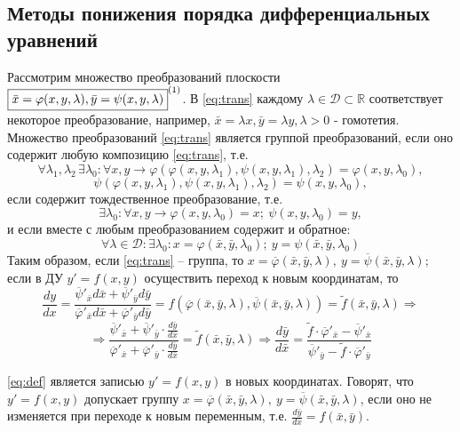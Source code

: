 \subsection{Методы понижения порядка дифференциальных уравнений}
\begin{proposition}

	Рассмотрим множество преобразований плоскости \\ $ \boxed{\bar{x} = \varphi(x, y, \lambda), \bar{y} = \psi (x, y, \lambda)}^{\eqnum\label{eq:trans}} $. В \eqref{eq:trans} каждому $ \lambda \in \mathcal{ D }  \subset \mathbb{ R } $ соответствует некоторое преобразование, например, $ \bar{x} = \lambda x, \bar{y} = \lambda y, \lambda > 0 $ - гомотетия. Множество преобразований \eqref{eq:trans}  является группой преобразований, если оно содержит любую композицию \eqref{eq:trans}, т.е. 
	\[ \forall \lambda_1, \lambda_2 \, \exists \lambda_0 : \forall x, y \rightarrow \varphi(\varphi(x, y, \lambda_1), \psi(x, y, \lambda_1), \lambda_2) = \varphi(x, y, \lambda_0),\]
	\[ \psi(\varphi(x, y, \lambda_1), \psi(x, y, \lambda_1), \lambda_2) = \psi(x, y, \lambda_0),\]
	если содержит тождественное преобразование, т.е. 
	\[ \exists \lambda_0: \forall x, y \rightarrow \varphi(x, y, \lambda_0) = x; \ \psi(x, y, \lambda_0) = y,\]
	и если вместе с любым преобразованием содержит и обратное: 
	\[ \forall \lambda \in \mathcal{D} \colon \exists \lambda_0 \colon x =  \varphi  (\bar{x}, \bar{y}, \lambda_0); \ y = \psi (\bar{x}, \bar{y}, \lambda_0) \]
	Таким образом, если \eqref{eq:trans} -- группа, то $ x = \overline{\varphi} (\bar{x}, \bar{y}, \lambda), \ y =  \overline{\psi}  (\bar{x}, \bar{y}, \lambda);$ если в ДУ $ y' = f(x, y)$ осуществить переход к новым координатам, то \\
	$$
	\frac{dy}{dx} = \frac{ \overline{\psi}'_{ \bar{x} } d\bar{x} +  \overline{\psi}'_{ \bar{y} } d\bar{y} }{ \overline{\varphi}'_{\bar{x}} d\bar{x} + \overline{\varphi}'_{\bar{y}} d\bar{y}} = f(\overline{ \varphi }(\bar{x}, \bar{y}, \lambda), \overline{ \psi }(\bar{x}, \bar{y}, \lambda)) = \tilde{f}(\bar{x}, \bar{y}, \lambda) \Rightarrow
	$$	
	\begin{equation} \label{eq:def}
	\Rightarrow \frac{ \overline{\psi}'_{ \bar{x} } + \overline{\psi}'_{ \bar{y} } \cdot \frac{d\bar{y}}{d\bar{x}} }{ \overline{\varphi}'_{\bar{x}} + \overline{\varphi}'_{\bar{y}} \cdot \frac{d\bar{y}}{d\bar{x}} } = \tilde{f}(\bar{x}, \bar{y}, \lambda) \Rightarrow \frac{d\bar{y}}{d\bar{x}} = \frac{\tilde{f} \cdot  \overline{\varphi}'_{\bar{x}} - \overline{\psi}'_{\bar{x} } }{ \overline{\psi}'_{\bar{y}} - \tilde{f} \cdot \overline{\varphi}'_{\bar{y}}}
	\end{equation}  
	
	\eqref{eq:def} является записью $ y' = f(x, y) $ в новых координатах. Говорят, что $ y' = f(x, y) $ допускает группу $ x = \overline{\varphi} (\bar{x}, \bar{y}, \lambda), \ y =  \overline{\psi} (\bar{x}, \bar{y}, \lambda)$, если оно не изменяется при переходе к новым переменным, т.е. $ \frac{d\bar{y}}{d\bar{x}} = f(\bar{x}, \bar{y}) $.
\end{proposition}

